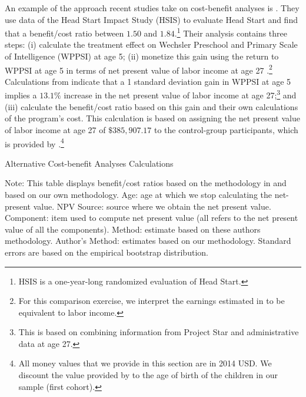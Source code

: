 \noindent An example of the approach recent studies take on cost-benefit analyses is \citet{Kline_Walters_2016_QJE}. They use data of the Head Start Impact Study (HSIS) to evaluate Head Start and find that a benefit/cost ratio between $1.50$ and $1.84$.\footnote{HSIS is a one-year-long randomized evaluation of Head Start.} Their analysis contains three steps: (i) calculate the treatment effect on Wechsler Preschool and Primary Scale of Intelligence (WPPSI) at age 5; (ii) monetize this gain using the return to WPPSI at age 5 in terms of net present value of labor income at age 27 \citep{Chetty_Friedman_etal_2011_QJoE}.\footnote{For this comparison exercise, we interpret the earnings estimated in \citet{Chetty_Friedman_etal_2011_QJoE} to be equivalent to labor income.} Calculations from \citet{Chetty_Friedman_etal_2011_QJoE} indicate that a 1 standard deviation gain in WPPSI at age 5 implies a $13.1\%$ increase in the net present value of labor income at age 27;\footnote{This is based on combining information from Project Star and administrative data at age 27.} and (iii) calculate the benefit/cost ratio based on this gain and their own calculations of the program's cost. This calculation is based on assigning the net present value of labor income at age 27 of $\$385,907.17$ to the control-group participants, which is provided by  \citet{Chetty_Friedman_etal_2011_QJoE}.\footnote{All money values that we provide in this section are in 2014 USD. We discount the value provided by \citet{Chetty_Friedman_etal_2011_QJoE} to the age of birth of the children in our sample (first cohort).}


\begin{table}[!htbp]
\begin{threeparttable}
\caption{Alternative Cost-benefit Analyses Calculations}
\label{table:comparing}
\centering
\footnotesize

\begin{tablenotes}
\footnotesize
\item Note: This table displays benefit/cost ratios based on the methodology in \citet{Kline_Walters_2016_QJE} and based on our own methodology. Age: age at which we stop calculating the net-present value. NPV Source: source where we obtain the net present value. Component: item used to compute net present value (all refers to the net present value of all the components). \citet{Kline_Walters_2016_QJE} Method: estimate based on these authors methodology. Author's Method: estimates based on our methodology. Standard errors are based on the empirical bootstrap distribution.
\end{tablenotes}
\end{threeparttable}
\end{table}

